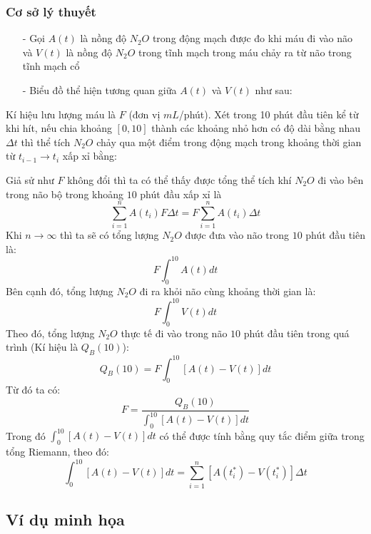 \documentclass[12pt,a4paper]{article}
\begin{document}
			\subsubsection{Cơ sở lý thuyết}
			\begin{itemize}
				\item[-] Gọi $A(t)$ là nồng độ $N_2O$ trong động mạch được đo khi máu đi vào não và $V(t)$ là nồng độ $N_2O$ trong tĩnh mạch trong máu chảy ra từ não trong tĩnh mạch cổ
				\item[-] Biểu đồ thể hiện tương quan giữa $A(t)$ và $V(t)$ như sau:
			\end{itemize}
			\begin{flushleft}
				Kí hiệu lưu lượng máu là $F$ (đơn vị $mL$/phút). Xét trong 10 phút đầu tiên
				kể từ khi hít, nếu chia khoảng $\left[0,10\right]$ thành các khoảng nhỏ hơn có độ dài bằng nhau $\Delta t$ thì 
				thể tích $N_2O$ chảy qua một điểm trong động mạch trong khoảng thời gian từ $t_{i-1} \to t_i$ xấp xỉ bằng:

				Giả sử như $F$ không đổi thì ta có thể thấy được tổng thể tích khí $N_2O$ đi vào bên trong não bộ trong khoảng $10$ phút đầu xấp xỉ là
				$$\sum_{i = 1}^{n} A(t_i)F\Delta t = F \sum_{i = 1}^{n} A(t_i) \Delta t$$
				Khi $n \to \infty$ thì ta sẽ có tổng lượng $N_2O$ được đưa vào não trong $10$ phút đầu tiên là:
				$$F \int_{0}^{10} A(t)dt$$
				Bên cạnh đó, tổng lượng $N_2O$ đi ra khỏi não cùng khoảng thời gian là:
				$$F \int_{0}^{10} V(t)dt$$
				Theo đó, tổng lượng $N_2O$ thực tế đi vào trong não $10$ phút đầu tiên trong quá trình (Kí hiệu là $Q_B(10)$):
				$$Q_B(10)=F\int_{0}^{10}\left[A(t)-V(t)\right]dt$$
				Từ đó ta có:
				$$F=\frac{Q_B(10)}{\displaystyle \int_{0}^{10}\left[A(t) - V(t)\right]dt}$$
				Trong đó $\displaystyle \int_{0}^{10}\left[A(t) - V(t)\right]dt$ có thể được tính bằng quy tắc điểm giữa trong tổng Riemann, theo đó:
				$$\displaystyle \int_{0}^{10}\left[A(t) - V(t)\right]dt = \sum_{i = 1}^{n} \left[A(t_i^*)-V(t_i^*)\right] \Delta t$$
			\end{flushleft}
		\subsection{Ví dụ minh họa}
\newpage
\end{document}
